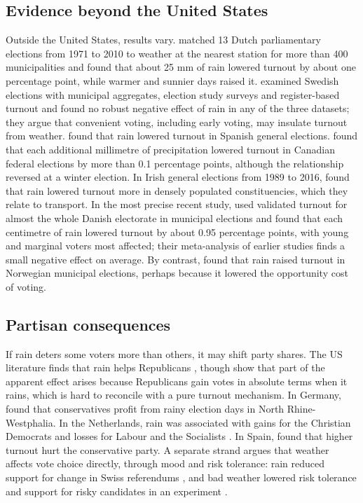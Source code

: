 \documentclass[11pt,a4paper]{article}
\begin{document}
\subsection{Evidence beyond the United States}
Outside the United States, results vary. \citet{eisinga2012turnout} matched 13 Dutch parliamentary elections from 1971 to 2010 to weather at the nearest station for more than 400 municipalities and found that about 25 mm of rain lowered turnout by about one percentage point, while warmer and sunnier days raised it. \citet{persson2014} examined Swedish elections with municipal aggregates, election study surveys and register-based turnout and found no robust negative effect of rain in any of the three datasets; they argue that convenient voting, including early voting, may insulate turnout from weather. \citet{artes2014} found that rain lowered turnout in Spanish general elections. \citet{stockemerwigginton2018} found that each additional millimetre of precipitation lowered turnout in Canadian federal elections by more than 0.1 percentage points, although the relationship reversed at a winter election. In Irish general elections from 1989 to 2016, \citet{garciaredmond2020} found that rain lowered turnout more in densely populated constituencies, which they relate to transport. In the most precise recent study, \citet{damsbo2023} used validated turnout for almost the whole Danish electorate in municipal elections and found that each centimetre of rain lowered turnout by about 0.95 percentage points, with young and marginal voters most affected; their meta-analysis of earlier studies finds a small negative effect on average. By contrast, \citet{lind2020} found that rain raised turnout in Norwegian municipal elections, perhaps because it lowered the opportunity cost of voting.

\subsection{Partisan consequences}
If rain deters some voters more than others, it may shift party shares. The US literature finds that rain helps Republicans \citep{gomez2007,hansfordgomez2010}, though \citet{horiuchikang2018} show that part of the apparent effect arises because Republicans gain votes in absolute terms when it rains, which is hard to reconcile with a pure turnout mechanism. In Germany, \citet{arnoldfreier2015} found that conservatives profit from rainy election days in North Rhine-Westphalia. In the Netherlands, rain was associated with gains for the Christian Democrats and losses for Labour and the Socialists \citep{eisinga2012party}. In Spain, \citet{artes2014} found that higher turnout hurt the conservative party. A separate strand argues that weather affects vote choice directly, through mood and risk tolerance: rain reduced support for change in Swiss referendums \citep{meier2019}, and bad weather lowered risk tolerance and support for risky candidates in an experiment \citep{bassi2019}.
\end{document}
